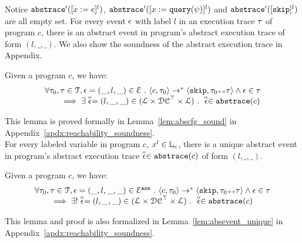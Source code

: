   Notice $\mathtt{abs}{\mathtt{trace}}'([x := e]^{l})$, $\mathtt{abs}{\mathtt{trace}}'([x := {\tt query}(\psi)]^{l})$ and $\mathtt{abs}{\mathtt{trace}}'([\mathtt{skip}]^{l})$ are all empty set. 
   For every event $\mathtt{\epsilon}$ with label $l$ in an execution trace $\mathtt{\tau}$ of program $c$, 
   there is an abstract event in program's abstract execution trace of form $(l, \_, \_)$.  
   We also show the soundness of the abstract execution trace in Appendix.
   \begin{lem}
     \label{lem:abscfg_sound}
   Given a program ${c}$, we have:
   \[
     \begin{array}{l}
       \forall \mathtt{\tau}_0, \mathtt{\tau} \in \mathcal{T} ,  \mathtt{\epsilon} = (\_, l, \_) \in \mathcal{E} ~.~
   \langle {c}, \mathtt{\tau}_0 \rangle \to^{*} \langle \mathtt{skip}, \mathtt{\tau}_0 {\scriptscriptstyle ++} \mathtt{\tau} \rangle 
   \land \mathtt{\epsilon} \in \mathtt{\tau} 
   \\
   \qquad \implies \exists \stackrel{\scriptscriptstyle{\alpha}}{\mathtt{\epsilon}{}} = (l, \_, \_) \in (\mathcal{L}\times \mathcal{DC}^{\top} \times \mathcal{L}) ~.~ 
   \stackrel{\scriptscriptstyle{\alpha}}{\mathtt{\epsilon}{}} \in \mathtt{abs}{\mathtt{trace}}(c)
   \end{array}
   \]
   \end{lem}
This lemma is proved formally in Lemma~\ref{lem:abscfg_sound} in Appendix~\ref{apdx:reachability_soundness}.
\\
For every labeled variable in program $c$, $x^l \in \mathbb{L}_c$, 
there is a unique abstract event in program's abstract execution trace $\stackrel{\scriptscriptstyle{\alpha}}{\mathtt{\epsilon}{}} \in \mathtt{abs}{\mathtt{trace}}(c)$ of form $(l, \_, \_)$. 
\begin{lem}
  \label{lem:abscfg_unique}
Given a program ${c}$, we have:
%
\[
  \begin{array}{l}
    \forall \mathtt{\tau}_0, \mathtt{\tau} \in \mathcal{T} ,  \mathtt{\epsilon} = (\_, l, \_, \_) \in \mathcal{E}^{\mathtt{{asn}}} ~.~
\langle {c}, \mathtt{\tau}_0 \rangle \to^{*} \langle \mathtt{skip}, \mathtt{\tau}_0 {\scriptscriptstyle ++} \mathtt{\tau} \rangle 
\land \mathtt{\epsilon} \in \mathtt{\tau} 
\\
\qquad \implies \exists! \stackrel{\scriptscriptstyle{\alpha}}{\mathtt{\epsilon}{}} = (l, \_, \_) \in (\mathcal{L}\times \mathcal{DC}^{\top} \times \mathcal{L}) ~.~ 
\stackrel{\scriptscriptstyle{\alpha}}{\mathtt{\epsilon}{}} \in \mathtt{abs}{\mathtt{trace}}(c)
\end{array}
\]
\end{lem}
This lemma and proof is also 
formalized in Lemma~\ref{lem:absevent_unique} in Appendix~\ref{apdx:reachability_soundness}.

